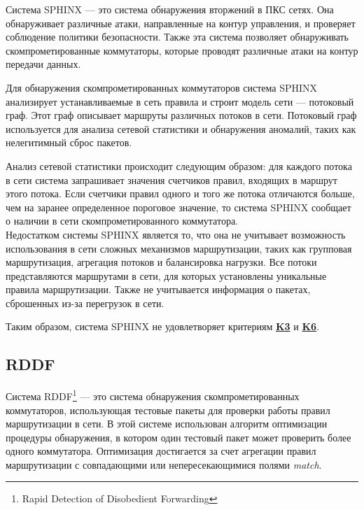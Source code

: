 \documentclass[../thesis.tex]{subfiles}
\begin{document}
Система SPHINX \cite{dhawan2015sphinx} ---  это система обнаружения вторжений в ПКС сетях.
Она обнаруживает различные атаки, направленные на контур управления, и проверяет соблюдение политики безопасности.
Также эта система позволяет обнаруживать скомпрометированные коммутаторы, которые проводят различные атаки на контур передачи данных.

Для обнаружения скомпрометированных коммутаторов система SPHINX анализирует устанавливаемые в сеть правила и строит модель сети --- потоковый граф.
Этот граф описывает маршруты различных потоков в сети.
Потоковый граф используется для анализа сетевой статистики и обнаружения аномалий, таких как нелегитимный сброс пакетов.

Анализ сетевой статистики происходит следующим образом: для каждого потока в сети система запрашивает значения счетчиков правил, входящих в маршрут этого потока.
Если счетчики правил одного и того же потока отличаются больше, чем на заранее определенное пороговое значение, то система SPHINX сообщает о наличии в сети скомпрометированного коммутатора.
\\

Недостатком системы SPHINX является то, что она не учитывает возможность использования в сети сложных механизмов маршрутизации, таких как групповая маршрутизация, агрегация потоков и балансировка нагрузки.
Все потоки представляются маршрутами в сети, для которых установлены уникальные правила маршрутизации.
Также не учитывается информация о пакетах, сброшенных из-за перегрузок в сети.

{
\hypersetup{linkcolor=black}

Таким образом, система SPHINX не удовлетворяет критериям \hyperref[criterion:K3]{\textbf{K3}} и \hyperref[criterion:K6]{\textbf{K6}}.
}

\subsection{RDDF} \label{subsection:system8}

Система RDDF\footnote{Rapid Detection of Disobedient Forwarding} \cite{chiu2017rapid} --- это система обнаружения скомпрометированных коммутаторов, использующая тестовые пакеты для проверки работы правил маршрутизации в сети.
В этой системе использован алгоритм оптимизации процедуры обнаружения, в котором один тестовый пакет может проверить более одного коммутатора.
Оптимизация достигается за счет агрегации правил маршрутизации с совпадающими или непересекающимися полями \textit{match}.
\end{document}

